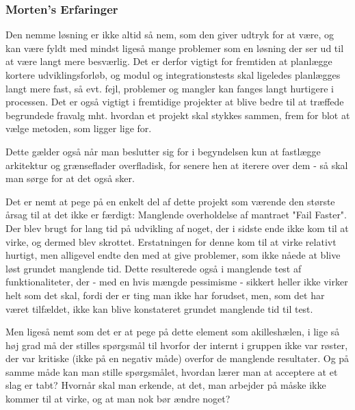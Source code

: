 \subsubsection{Morten's Erfaringer}

Den nemme løsning er ikke altid så nem, som den giver udtryk for at være, og kan være fyldt med mindst ligeså mange problemer som en løsning der ser ud til at være langt mere besværlig. Det er derfor vigtigt for fremtiden at planlægge kortere udviklingsforløb, og modul og integrationstests skal ligeledes planlægges langt mere fast, så evt. fejl, problemer og mangler kan fanges langt hurtigere i processen. Det er også vigtigt i fremtidige projekter at blive bedre til at træffede begrundede fravalg mht. hvordan et projekt skal stykkes sammen, frem for blot at vælge metoden, som ligger lige for.

Dette gælder også når man beslutter sig for i begyndelsen kun at fastlægge arkitektur og grænseflader overfladisk, for senere hen at iterere over dem - så skal man sørge for at det også sker.

Det er nemt at pege på en enkelt del af dette projekt som værende den største årsag til at det ikke er færdigt: Manglende overholdelse af mantraet "Fail Faster". Der blev brugt for lang tid på udvikling af noget, der i sidste ende ikke kom til at virke, og dermed blev skrottet. Erstatningen for denne kom til at virke relativt hurtigt, men alligevel endte den med at give problemer, som ikke nåede at blive løst grundet manglende tid. Dette resulterede også i manglende test af funktionaliteter, der - med en hvis mængde pessimisme - sikkert heller ikke virker helt som det skal, fordi der er ting man ikke har forudset, men, som det har været tilfældet, ikke kan blive konstateret grundet manglende tid til test.

Men ligeså nemt som det er at pege på dette element som akilleshælen, i lige så høj grad må der stilles spørgsmål til hvorfor der internt i gruppen ikke var røster, der var kritiske (ikke på en negativ måde) overfor de manglende resultater. Og på samme måde kan man stille spørgsmålet, hvordan lærer man at acceptere at et slag er tabt? Hvornår skal man erkende, at det, man arbejder på måske ikke kommer til at virke, og at man nok bør ændre noget?